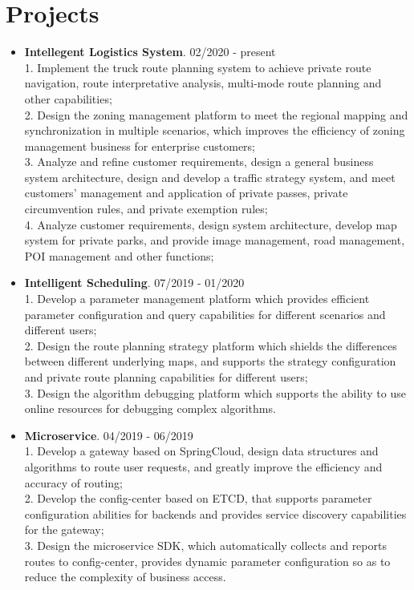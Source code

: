 \documentclass[letterpaper, UTF8]{article}
\begin{document}
	\section*{\textbf{Projects}}
	\begin{itemize}
		\item \textbf{Intellegent Logistics System}. 02/2020 - present\\
		1. Implement the truck route planning system to achieve private route navigation, route interpretative analysis, multi-mode route planning and other capabilities;\\
		2. Design the zoning management platform to meet the regional mapping and synchronization in multiple scenarios, which improves the efficiency of zoning management business for enterprise customers;\\
		3. Analyze and refine customer requirements, design a general business system architecture, design and develop a traffic strategy system, and meet customers' management and application of private passes, private circumvention rules, and private exemption rules;\\
		4. Analyze customer requirements, design system architecture, develop map system for private parks, and provide image management, road management, POI management and other functions;
		
		\item \textbf{Intelligent Scheduling}. 07/2019 - 01/2020\\
		1. Develop a parameter management platform which provides efficient parameter configuration and query capabilities for different scenarios and different users;\\
		2. Design the route planning strategy platform which shields the differences between different underlying maps, and supports the strategy configuration and private route planning capabilities for different users; \\
		3. Design the algorithm debugging platform which supports the ability to use online resources for debugging complex algorithms.
		
		\item \textbf{Microservice}. 04/2019 - 06/2019\\
		1. Develop a gateway based on SpringCloud, design data structures and algorithms to route user requests, and greatly improve the efficiency and accuracy of routing; \\
		2. Develop the config-center based on ETCD, that supports parameter configuration abilities for backends and provides service discovery capabilities for the gateway; \\
		3. Design the microservice SDK, which automatically collects and reports routes to config-center, provides dynamic parameter configuration so as to reduce the complexity of business access.
		

\end{itemize}
\end{document}
